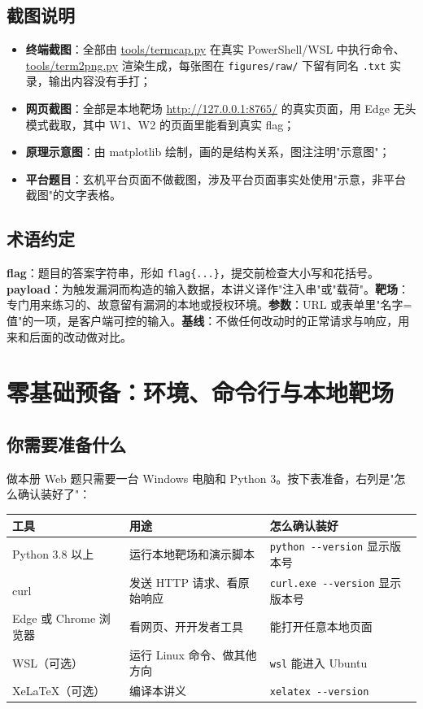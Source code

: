 \documentclass[UTF8,12pt,oneside]{ctexbook}
\begin{document}
\section*{截图说明}
\begin{itemize}
\item \textbf{终端截图}：全部由 \url{tools/termcap.py} 在真实 PowerShell/WSL 中执行命令、\url{tools/term2png.py} 渲染生成，每张图在 \verb|figures/raw/| 下留有同名 \verb|.txt| 实录，输出内容没有手打；
\item \textbf{网页截图}：全部是本地靶场 \url{http://127.0.0.1:8765/} 的真实页面，用 Edge 无头模式截取，其中 W1、W2 的页面里能看到真实 flag；
\item \textbf{原理示意图}：由 matplotlib 绘制，画的是结构关系，图注注明"示意图"；
\item \textbf{平台题目}：玄机平台页面不做截图，涉及平台页面事实处使用"示意，非平台截图"的文字表格。
\end{itemize}

\section*{术语约定}
\textbf{flag}：题目的答案字符串，形如 \verb|flag{...}|，提交前检查大小写和花括号。\textbf{payload}：为触发漏洞而构造的输入数据，本讲义译作"注入串"或"载荷"。\textbf{靶场}：专门用来练习的、故意留有漏洞的本地或授权环境。\textbf{参数}：URL 或表单里"名字=值"的一项，是客户端可控的输入。\textbf{基线}：不做任何改动时的正常请求与响应，用来和后面的改动做对比。

\tableofcontents
\mainmatter

\chapter{零基础预备：环境、命令行与本地靶场}
\label{web:prep}

\section{你需要准备什么}
做本册 Web 题只需要一台 Windows 电脑和 Python 3。按下表准备，右列是"怎么确认装好了"：
\begin{center}
\begin{tabular}{p{}p{}p{}}
\toprule
工具 & 用途 & 怎么确认装好 \\
\midrule
Python 3.8 以上 & 运行本地靶场和演示脚本 & \verb|python --version| 显示版本号 \\
curl & 发送 HTTP 请求、看原始响应 & \verb|curl.exe --version| 显示版本号 \\
Edge 或 Chrome 浏览器 & 看网页、开开发者工具 & 能打开任意本地页面 \\
WSL（可选）& 运行 Linux 命令、做其他方向 & \verb|wsl| 能进入 Ubuntu \\
XeLaTeX（可选）& 编译本讲义 & \verb|xelatex --version| \\
\bottomrule
\end{tabular}
\end{center}
\end{document}
